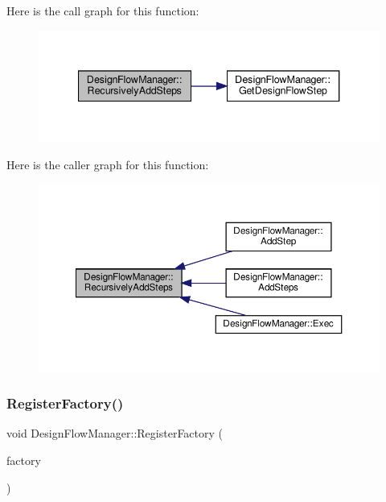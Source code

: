 Here is the call graph for this function\+:
\nopagebreak
\begin{figure}[H]
\begin{center}
\leavevmode
\includegraphics[width=340pt]{de/d63/classDesignFlowManager_ab5d3fe2338fef7db3edacd11d8539da0_cgraph}
\end{center}
\end{figure}
Here is the caller graph for this function\+:
\nopagebreak
\begin{figure}[H]
\begin{center}
\leavevmode
\includegraphics[width=350pt]{de/d63/classDesignFlowManager_ab5d3fe2338fef7db3edacd11d8539da0_icgraph}
\end{center}
\end{figure}
\mbox{\label{classDesignFlowManager_a863161302c892a561919d294e8d20e0d}} 
\subsubsection{\texorpdfstring{Register\+Factory()}{RegisterFactory()}}
{\footnotesize\ttfamily void Design\+Flow\+Manager\+::\+Register\+Factory (\begin{DoxyParamCaption}\item[{const Design\+Flow\+Step\+Factory\+Const\+Ref}]{factory }\end{DoxyParamCaption})}



